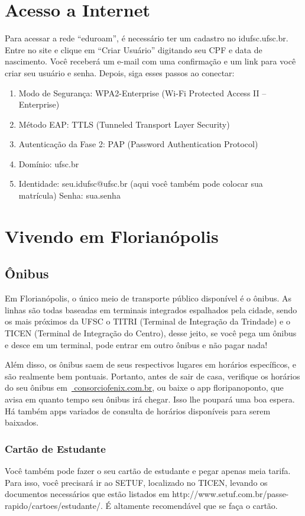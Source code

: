 \documentclass{article}
\begin{document}
\section{Acesso a Internet} 
Para acessar a rede “eduroam”, é necessário ter um cadastro no idufsc.ufsc.br. Entre no site e clique em “Criar Usuário” digitando seu CPF e data de nascimento. Você receberá um e-mail com uma confirmação e um link para você criar seu usuário e senha. Depois, siga esses passos ao conectar: 
\begin{enumerate}
\item Modo de Segurança: WPA2-Enterprise (Wi-Fi Protected Access II – Enterprise)

\item Método EAP: TTLS (Tunneled Transport Layer Security)

\item Autenticação da Fase 2: PAP (Password Authentication Protocol)

\item Domínio: ufsc.br

\item Identidade: seu.idufsc@ufsc.br (aqui você também pode colocar sua matrícula)
Senha: sua.senha
\end{enumerate}

\section{Vivendo em Florianópolis}
\subsection{Ônibus}
Em Florianópolis, o único meio de transporte público disponível é o ônibus. As linhas são todas baseadas em terminais integrados espalhados pela cidade, sendo os mais próximos da UFSC o TITRI (Terminal de Integração da Trindade) e o TICEN (Terminal de Integração do Centro), desse jeito, se você pega um ônibus e desce em um terminal, pode entrar em outro ônibus e não pagar nada!

Além disso, os ônibus saem de seus respectivos lugares em horários específicos, e são realmente bem pontuais. Portanto, antes de sair de casa, verifique os horários do seu ônibus em~\url{ consorciofenix.com.br}, ou baixe o app floripanoponto, que avisa em quanto tempo seu ônibus irá chegar. Isso lhe poupará uma boa espera. Há também apps variados de consulta de horários disponíveis para serem baixados.

\subsubsection{Cartão de Estudante}
Você também pode fazer o seu cartão de estudante e pegar apenas meia tarifa. Para isso, você precisará ir ao SETUF, localizado no TICEN, levando os documentos necessários que estão listados em http://www.setuf.com.br/passe-rapido/cartoes/estudante/.  É altamente recomendável que se faça o cartão.
\end{document}
